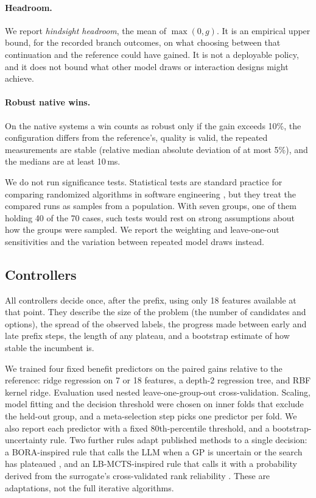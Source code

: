 \paragraph{Headroom.} We report \emph{hindsight headroom}, the mean of $\max(0, g)$. It is an empirical upper bound, for the recorded branch outcomes, on what choosing between that continuation and the reference could have gained. It is not a deployable policy, and it does not bound what other model draws or interaction designs might achieve.

\paragraph{Robust native wins.} On the native systems a win counts as robust only if the gain exceeds 10\%, the configuration differs from the reference's, quality is valid, the repeated measurements are stable (relative median absolute deviation of at most 5\%), and the medians are at least 10\,ms.

We do not run significance tests. Statistical tests are standard practice for comparing randomized algorithms in software engineering \cite{arcuri2011practical}, but they treat the compared runs as samples from a population. With seven groups, one of them holding 40 of the 70 cases, such tests would rest on strong assumptions about how the groups were sampled. We report the weighting and leave-one-out sensitivities and the variation between repeated model draws instead.

\subsection{Controllers}

All controllers decide once, after the prefix, using only 18 features available at that point. They describe the size of the problem (the number of candidates and options), the spread of the observed labels, the progress made between early and late prefix steps, the length of any plateau, and a bootstrap estimate of how stable the incumbent is.

We trained four fixed benefit predictors on the paired gains relative to the reference: ridge regression on 7 or 18 features, a depth-2 regression tree, and RBF kernel ridge. Evaluation used nested leave-one-group-out cross-validation. Scaling, model fitting and the decision threshold were chosen on inner folds that exclude the held-out group, and a meta-selection step picks one predictor per fold. We also report each predictor with a fixed 80th-percentile threshold, and a bootstrap-uncertainty rule. Two further rules adapt published methods to a single decision: a BORA-inspired rule that calls the LLM when a GP is uncertain or the search has plateaued \cite{cisse2025bora}, and an LB-MCTS-inspired rule that calls it with a probability derived from the surrogate's cross-validated rank reliability \cite{xu2026lbmcts}. These are adaptations, not the full iterative algorithms.

